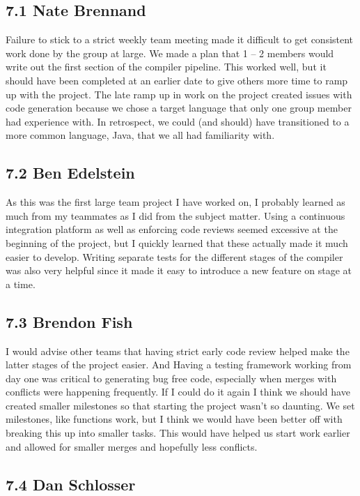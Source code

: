 
\subsection*{7.1 Nate Brennand}

Failure to stick to a strict weekly team meeting made it difficult to get consistent work done by the group at large.
We made a plan that 1 – 2 members would write out the first section of the compiler pipeline.
This worked well, but it should have been completed at an earlier date to give others more time to ramp up with the project.
The late ramp up in work on the project created issues with code generation because we chose a target language that only one group member had experience with.
In retrospect, we could (and should) have transitioned to a more common language, Java, that we all had familiarity with.

\subsection*{7.2 Ben Edelstein}

As this was the first large team project I have worked on, I probably learned as much from my teammates as I did from the subject matter. Using a continuous integration platform as well as enforcing code reviews seemed excessive at the beginning of the project, but I quickly learned that these actually made it much easier to develop. Writing separate tests for the different stages of the compiler was also very helpful since it made it easy to introduce a new feature on stage at a time.

\subsection*{7.3 Brendon Fish}

I would advise other teams that having strict early code review helped make the latter stages of the project easier.  And Having a testing framework working from day one was critical to generating bug free code, especially when merges with conflicts were happening frequently.
If I could do it again I think we should have created smaller milestones so that starting the project wasn't so daunting.  We set milestones, like functions work, but I think we would have been better off with breaking this up into smaller tasks.  This would have helped us start work earlier and allowed for smaller merges and hopefully less conflicts.

\subsection*{7.4 Dan Schlosser}

